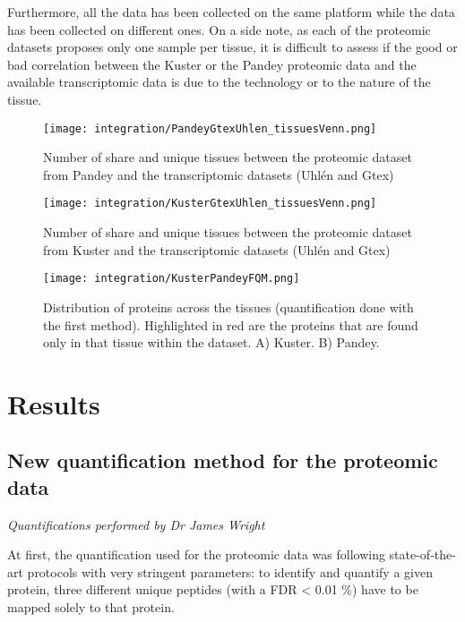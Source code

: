 Furthermore, all the  data has been
collected on the same platform while the  data has been collected on
different ones. On a side note, as each of the proteomic datasets proposes
only one sample per tissue, it is difficult to assess if the good or bad
correlation between the Kuster \etal or the Pandey \etal
proteomic data and the available transcriptomic data is due to the technology or
to the nature of the tissue.

\begin{figure}
    \texttt{[image: integration/PandeyGtexUhlen\_tissuesVenn.png]}\centering
    \caption{\label{VennTissuePandeyGtexUhlen}Number of share and unique
    tissues between the proteomic dataset
    from Pandey \etal and the transcriptomic datasets (Uhlén \etal and Gtex)}
\end{figure}



\begin{figure}
    \texttt{[image: integration/KusterGtexUhlen\_tissuesVenn.png]}\centering
    \caption{\label{VennTissueKusterGtexUhlen}Number of share and unique
    tissues between the proteomic dataset
    from Kuster \etal and the transcriptomic datasets (Uhlén \etal and Gtex)}
\end{figure}


\begin{figure}
    \texttt{[image: integration/KusterPandeyFQM.png]}\centering
    \caption{\label{KusterPandeyFQM}Distribution of proteins across the tissues
    (quantification done with the first method). Highlighted in red are the
    proteins that are found only in that
    tissue within the dataset. A) Kuster. B) Pandey.}
\end{figure}



\section{Results}
\subsection{New quantification method for the proteomic data}
\label{subsec:newMethQuant}
\textit{Quantifications performed by Dr James Wright}

At first, the quantification used for the proteomic data was following
state-of-the-art protocols with very stringent parameters:
to identify and quantify a given protein, three different unique peptides
(with a FDR < 0.01 \%) have to be mapped solely to that protein.

